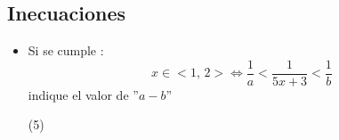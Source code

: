 \documentclass[10pt, twocolumn, landscape, a4paper]{article}
\begin{document}
\subsection*{Inecuaciones}
\begin{itemize}
\item{Si se cumple : 
$$
x \in \Big<1,\,2\Big> \iff \dfrac{1}{a} < \dfrac{1}{5x + 3} < \dfrac{1}{b}
$$
indique el valor de \quad ''$a - b$'' 

\begin{tasks}(5)
\end{tasks}
}
\end{itemize}
\end{document}
